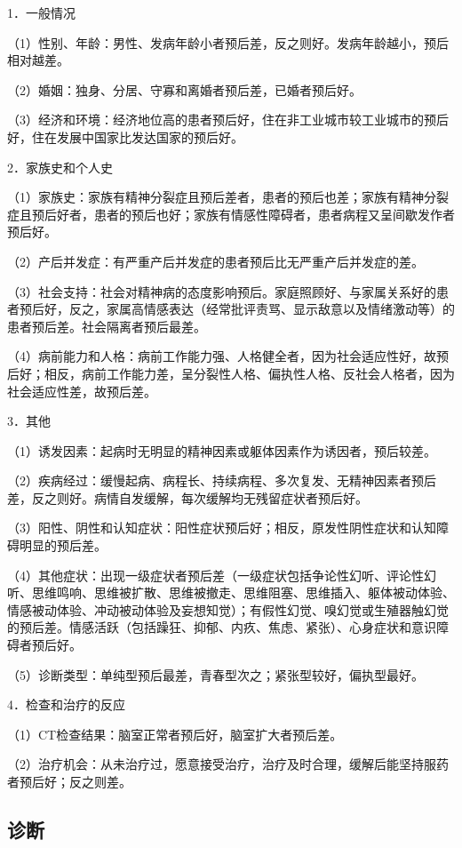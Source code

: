 1．一般情况

（1）性别、年龄：男性、发病年龄小者预后差，反之则好。发病年龄越小，预后相对越差。

（2）婚姻：独身、分居、守寡和离婚者预后差，已婚者预后好。

（3）经济和环境：经济地位高的患者预后好，住在非工业城市较工业城市的预后好，住在发展中国家比发达国家的预后好。

2．家族史和个人史

（1）家族史：家族有精神分裂症且预后差者，患者的预后也差；家族有精神分裂症且预后好者，患者的预后也好；家族有情感性障碍者，患者病程又呈间歇发作者预后好。

（2）产后并发症：有严重产后并发症的患者预后比无严重产后并发症的差。

（3）社会支持：社会对精神病的态度影响预后。家庭照顾好、与家属关系好的患者预后好，反之，家属高情感表达（经常批评责骂、显示敌意以及情绪激动等）的患者预后差。社会隔离者预后最差。

（4）病前能力和人格：病前工作能力强、人格健全者，因为社会适应性好，故预后好；相反，病前工作能力差，呈分裂性人格、偏执性人格、反社会人格者，因为社会适应性差，故预后差。

3．其他

（1）诱发因素：起病时无明显的精神因素或躯体因素作为诱因者，预后较差。

（2）疾病经过：缓慢起病、病程长、持续病程、多次复发、无精神因素者预后差，反之则好。病情自发缓解，每次缓解均无残留症状者预后好。

（3）阳性、阴性和认知症状：阳性症状预后好；相反，原发性阴性症状和认知障碍明显的预后差。

（4）其他症状：出现一级症状者预后差（一级症状包括争论性幻听、评论性幻听、思维鸣响、思维被扩散、思维被撤走、思维阻塞、思维插入、躯体被动体验、情感被动体验、冲动被动体验及妄想知觉）；有假性幻觉、嗅幻觉或生殖器触幻觉的预后差。情感活跃（包括躁狂、抑郁、内疚、焦虑、紧张）、心身症状和意识障碍者预后好。

（5）诊断类型：单纯型预后最差，青春型次之；紧张型较好，偏执型最好。

4．检查和治疗的反应

（1）CT检查结果：脑室正常者预后好，脑室扩大者预后差。

（2）治疗机会：从未治疗过，愿意接受治疗，治疗及时合理，缓解后能坚持服药者预后好；反之则差。

\subsection{诊断}

